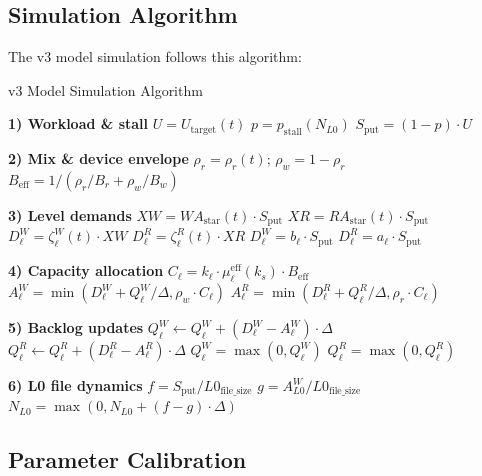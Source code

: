 \documentclass[11pt]{article}
\begin{document}



\subsection{Simulation Algorithm}

The v3 model simulation follows this algorithm:

\begin{algorithm}[H]
\caption{v3 Model Simulation Algorithm}
\begin{algorithmic}[1]
\FOR{$t \in [0, T)$ step $\Delta$}
    \STATE \textbf{1) Workload \& stall}
    \STATE $U = U_{\text{target}}(t)$
    \STATE $p = p_{\text{stall}}(N_{L0})$
    \STATE $S_{\text{put}} = (1 - p) \cdot U$
    
    \STATE \textbf{2) Mix \& device envelope}
    \STATE $\rho_r = \rho_r(t)$; $\rho_w = 1 - \rho_r$
    \STATE $B_{\text{eff}} = 1 / (\rho_r/B_r + \rho_w/B_w)$
    
    \STATE \textbf{3) Level demands}
        \STATE $XW = WA_{\text{star}}(t) \cdot S_{\text{put}}$
        \STATE $XR = RA_{\text{star}}(t) \cdot S_{\text{put}}$
        \STATE $D^W_\ell = \zeta^W_\ell(t) \cdot XW$
        \STATE $D^R_\ell = \zeta^R_\ell(t) \cdot XR$
    \ELSE
        \STATE $D^W_\ell = b_\ell \cdot S_{\text{put}}$
        \STATE $D^R_\ell = a_\ell \cdot S_{\text{put}}$
    \ENDIF
    
    \STATE \textbf{4) Capacity allocation}
    \STATE $C_\ell = k_\ell \cdot \mu_\ell^{\text{eff}}(k_s) \cdot B_{\text{eff}}$
    \STATE $A^W_\ell = \min(D^W_\ell + Q^W_\ell/\Delta, \rho_w \cdot C_\ell)$
    \STATE $A^R_\ell = \min(D^R_\ell + Q^R_\ell/\Delta, \rho_r \cdot C_\ell)$
    
    \STATE \textbf{5) Backlog updates}
    \STATE $Q^W_\ell \leftarrow Q^W_\ell + (D^W_\ell - A^W_\ell) \cdot \Delta$
    \STATE $Q^R_\ell \leftarrow Q^R_\ell + (D^R_\ell - A^R_\ell) \cdot \Delta$
    \STATE $Q^W_\ell = \max(0, Q^W_\ell)$
    \STATE $Q^R_\ell = \max(0, Q^R_\ell)$
    
    \STATE \textbf{6) L0 file dynamics}
    \STATE $f = S_{\text{put}} / L0_{\text{file\_size}}$
    \STATE $g = A^W_{L0} / L0_{\text{file\_size}}$
    \STATE $N_{L0} = \max(0, N_{L0} + (f - g) \cdot \Delta)$
\ENDFOR
\end{algorithmic}
\end{algorithm}

\subsection{Parameter Calibration}
\end{document}
